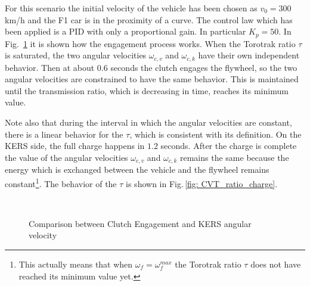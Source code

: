 \documentclass[11pt]{article}
\begin{document}
For this scenario the initial velocity of the vehicle has been chosen as $v_0 = 300$ km/h and the F1 car is in the proximity of a curve. The control law which has been applied is a PID with only a proportional gain. In particular $K_p = 50$. In Fig.~\ref{fig: Engagement_plus_KERS_Vel_Charge} it is shown how the engagement process works. When the Torotrak ratio $\tau$ is saturated, the two angular velocities $\omega_{c,v}$ and $\omega_{c,k}$ have their own independent behavior. Then at about $0.6$ seconds the clutch engages the flywheel, so the two angular velocities are constrained to have the same behavior. This is maintained until the transmission ratio, which is decreasing in time, reaches its minimum value. 

Note also that during the interval in which the angular velocities are constant, there is a linear behavior for the $\tau$, which is consistent with its definition. On the KERS side, the full charge happens in $1.2$ seconds. After the charge is complete the value of the angular velocities $\omega_{c,v}$ and $\omega_{c,k}$ remains the same because the energy which is exchanged between the vehicle and the flywheel remains constant\footnote{This actually means that when $\omega_f = \omega_f^{max}$ the Torotrak ratio $\tau$ does not have reached its minimum value yet.}. The behavior of the $\tau$ is shown in Fig.\,\ref{fig: CVT_ratio_charge}.

\begin{figure}[H]
\centering
{} \quad
{} \\
\caption{Comparison between Clutch Engagement \protect{} and KERS angular velocity \protect{}}
\label{fig: Engagement_plus_KERS_Vel_Charge}
\end{figure}
\end{document}
